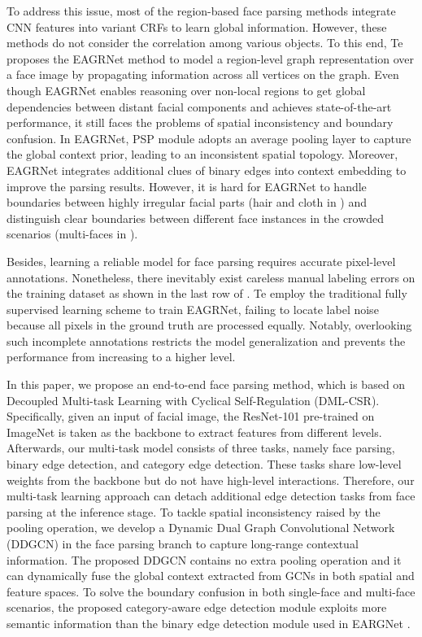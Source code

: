\documentclass[10pt,twocolumn,letterpaper]{article}
\begin{document}
To address this issue, most of the region-based face parsing methods \cite{multi_objective, cnn_cascade, Zhou2017FacePV} integrate CNN features into variant CRFs to learn global information. However, these methods do not consider the correlation among various objects. To this end, Te \etal \cite{te2020edge} proposes the EAGRNet method to model a region-level graph representation over a face image by propagating information across all vertices on the graph. Even though EAGRNet enables reasoning over non-local regions to get global dependencies between distant facial components and achieves state-of-the-art performance, it still faces the problems of spatial inconsistency and boundary confusion. 
In EAGRNet, PSP module \cite{psp} adopts an average pooling layer \cite{Long_2015_CVPR} to capture the global context prior, leading to an inconsistent spatial topology. 
Moreover, EAGRNet integrates additional clues of binary edges into context embedding to improve the parsing results. However, it is hard for EAGRNet to handle boundaries between highly irregular facial parts (\eg hair and cloth in \figureautorefname{ \ref{fig:failure_case_of_fcn}}) and distinguish clear boundaries between different face instances in the crowded scenarios (multi-faces in \figureautorefname{ \ref{fig:failure_case_of_fcn}}). 

Besides, learning a reliable model for face parsing requires accurate pixel-level annotations. Nonetheless, there inevitably exist careless manual labeling errors on the training dataset as shown in the last row of \figureautorefname{ \ref{fig:failure_case_of_fcn}}. 
Te \etal \cite{te2020edge} employ the traditional fully supervised learning scheme to train EAGRNet, failing to locate label noise because all pixels in the ground truth are processed equally. Notably, overlooking such incomplete annotations restricts the model generalization and prevents the performance from increasing to a higher level.

In this paper, we propose an end-to-end face parsing method, which is based on Decoupled Multi-task Learning with Cyclical Self-Regulation (DML-CSR). Specifically, given an input of facial image, the ResNet-101 \cite{resnet101} pre-trained on ImageNet is taken as the backbone to extract features from different levels. Afterwards, our multi-task model consists of three tasks, namely face parsing, binary edge detection, and category edge detection. These tasks share low-level weights from the backbone but do not have high-level interactions. Therefore, our multi-task learning approach can detach additional edge detection tasks from face parsing at the inference stage. To tackle spatial inconsistency raised by the pooling operation, we develop a Dynamic Dual Graph Convolutional Network (DDGCN) in the face parsing branch to capture long-range contextual information. The proposed DDGCN contains no extra pooling operation and it can dynamically fuse the global context extracted from GCNs in both spatial and feature spaces. To solve the boundary confusion in both single-face and multi-face scenarios, the proposed category-aware edge detection module exploits more semantic information than the binary edge detection module used in EARGNet \cite{te2020edge}. 
\end{document}
